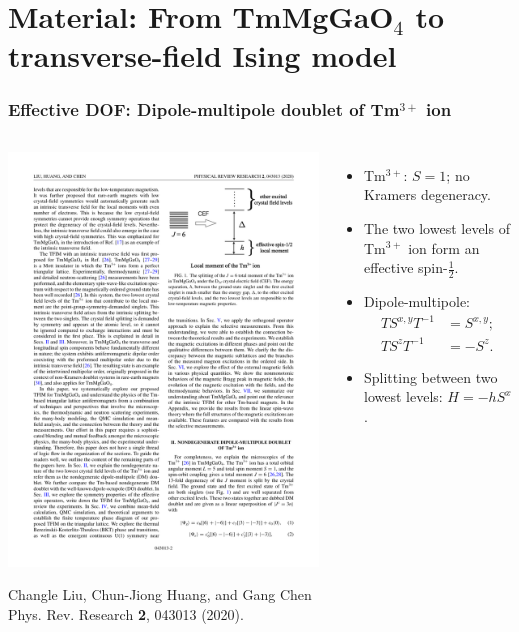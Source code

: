 \documentclass[xcolor=table, aspectratio=1610,ignorenonframetext]{beamer}
\begin{document}
\section{Material: From TmMgGaO${}_4$ to transverse-field Ising model}

\begin{frame}
  \frametitle{Effective DOF: Dipole-multipole doublet of Tm${}^{3+}$ ion}
  \begin{columns}
    \begin{center}
      \includegraphics[width=\textwidth]{tm3+}

      {\small Changle Liu, Chun-Jiong Huang, and Gang Chen\\
        Phys. Rev. Research \textbf{2}, 043013 (2020).}
    \end{center}
    \begin{itemize}
    \item Tm${}^{3+}$: $S=1$; no Kramers degeneracy.
    \item The two lowest levels of Tm${}^{3+}$ ion form an effective spin-$\frac12$.
    \item Dipole-multipole:
      \begin{align*}TS^{x,y}T^{-1}&=S^{x,y};\\
        TS^zT^{-1}&=-S^z.\end{align*}
    \item Splitting between two lowest levels: $H=-hS^x$.
    \end{itemize}
  \end{columns}
\end{frame}
\end{document}
